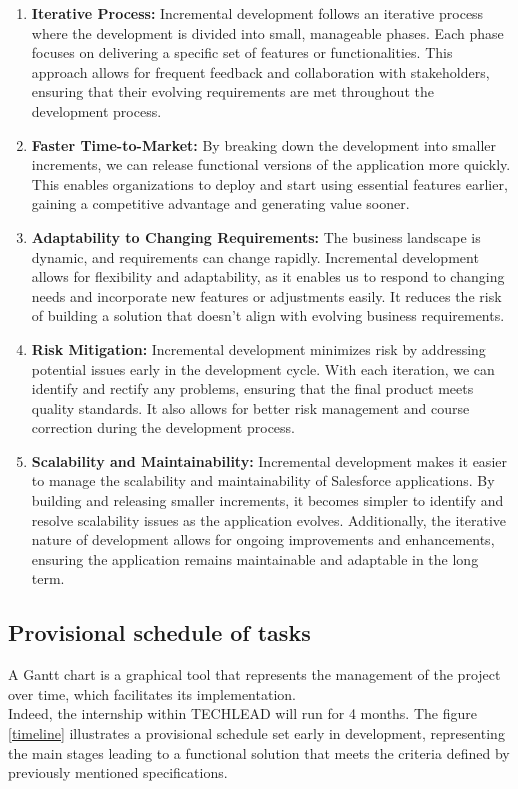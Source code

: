 \begin{enumerate}
\item \textbf{Iterative Process:} Incremental development follows an iterative process where the development is divided into small, manageable phases. Each phase focuses on delivering a specific set of features or functionalities. This approach allows for frequent feedback and collaboration with stakeholders, ensuring that their evolving requirements are met throughout the development process.
\item \textbf{Faster Time-to-Market:} By breaking down the development into smaller increments, we can release functional versions of the application more quickly. This enables organizations to deploy and start using essential features earlier, gaining a competitive advantage and generating value sooner.
\item \textbf{Adaptability to Changing Requirements:} The business landscape is dynamic, and requirements can change rapidly. Incremental development allows for flexibility and adaptability, as it enables us to respond to changing needs and incorporate new features or adjustments easily. It reduces the risk of building a solution that doesn't align with evolving business requirements.
\item \textbf{Risk Mitigation:} Incremental development minimizes risk by addressing potential issues early in the development cycle. With each iteration, we can identify and rectify any problems, ensuring that the final product meets quality standards. It also allows for better risk management and course correction during the development process.
\item \textbf{Scalability and Maintainability:} Incremental development makes it easier to manage the scalability and maintainability of Salesforce applications. By building and releasing smaller increments, it becomes simpler to identify and resolve scalability issues as the application evolves. Additionally, the iterative nature of development allows for ongoing improvements and enhancements, ensuring the application remains maintainable and adaptable in the long term.
\end{enumerate}





\subsection{Provisional schedule of tasks}
A Gantt chart is a graphical tool that represents the management
of the project over time, which facilitates its implementation.\\
Indeed, the internship within TECHLEAD will run for 4 months. The figure \ref{timeline} illustrates a provisional schedule set early in development, representing the main stages leading to a functional solution that meets the criteria defined by previously mentioned specifications.

